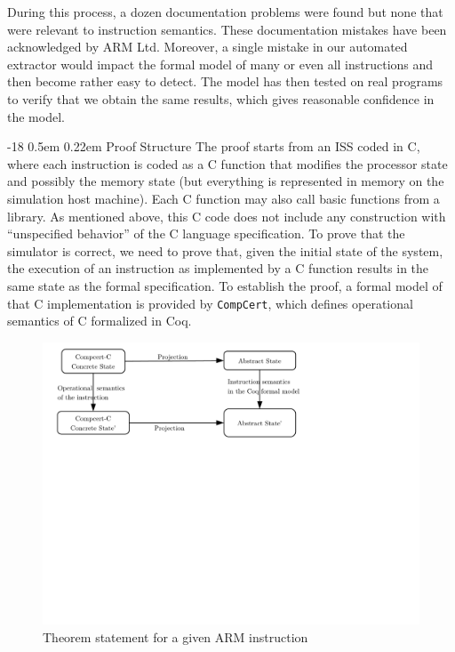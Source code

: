 \documentclass{llncs}
\makeatletter
\newcommand{\compcert}{\texttt{CompCert}\xspace}
\renewcommand\subsubsection{\@startsection{subsubsection}{3}{\z@}%
                       {-18\p@ \@plus -4\p@ \@minus -4\p@}%
                       {0.5em \@plus 0.22em}%
                       {\normalfont\normalsize\bfseries\boldmath}}
\makeatother
\begin{document}
During this process, a dozen documentation problems were found but
none that were relevant to instruction semantics. These documentation
mistakes have been acknowledged by ARM Ltd.  Moreover, a single
mistake in our automated extractor would impact the formal model of
many or even all instructions and then become rather easy to detect.
The model has then tested on real programs to verify that we obtain
the same results, which gives reasonable confidence in the model.

\subsubsection{Proof Structure}
The proof starts from an ISS coded in C, where each instruction is
coded as a C function that modifies the processor state and possibly
the memory state (but everything is represented in memory on the
simulation host machine). Each C function may also call basic
functions from a library. As mentioned above, this C code does not
include any construction with ``unspecified behavior'' of the C
language specification. To prove that the simulator is correct, we
need to prove that, given the initial state of the system, the
execution of an instruction as implemented by a C function results in
the same state as the formal specification. To establish the proof, a
formal model of that C implementation is provided by \compcert, which
defines operational semantics of C formalized in Coq.

\begin{figure}[htb]
\hfil\includegraphics[width=0.9\linewidth, trim= 10mm 138mm 60mm 5mm, clip=true]{fig/newproj.pdf}
\caption{Theorem statement for a given ARM instruction}
\label{fig:theoca}
\end{figure}
\end{document}
